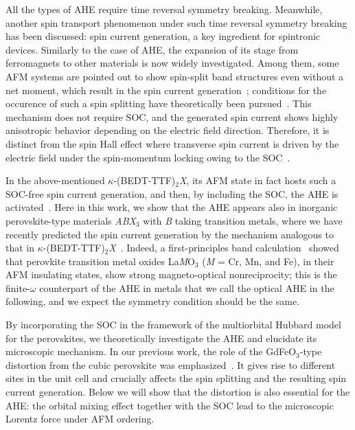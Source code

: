 \documentclass[aps,twocolumn,prb,preprintnumbers,amsmath,amssymb]{revtex4-2}
\begin{document}
All the types of AHE require time reversal symmetry breaking. 
Meanwhile, another spin transport phenomenon under such time reversal symmetry breaking has been discussed: 
 spin current generation, a key ingredient for spintronic devices. 
Similarly to the case of AHE, the expansion of its stage from ferromagnets to other materials is now widely investigated. 
Among them, some AFM systems are pointed out to show spin-split band structures even without a net moment, 
 which result in the spin current generation~\cite{naka2, gonzalez}; 
 conditions for the occurence of such a spin splitting have theoretically been pursued~\cite{hayami, hayami2, yuan, hayami3, yuan2}. 
This mechanism does not require SOC, and the generated spin current shows highly anisotropic behavior depending on the electric field direction. 
Therefore, it is distinct from the spin Hall effect where transverse spin current is driven by the electric field 
 under the spin-momentum locking owing to the SOC~\cite{dyakonov, hirsch, murakami, sinova}. 

In the above-mentioned $\kappa$-(BEDT-TTF)$_2${\it X}, 
 its AFM state in fact hosts such a SOC-free spin current generation, 
 and then, by including the SOC, the AHE is activated~\cite{naka}. 
Here in this work, we show that the AHE appears also in inorganic perovskite-type materials {\it ABX}$_3$ with {\it B} taking transition metals, 
 where we have recently predicted the spin current generation by the mechanism analogous to that in $\kappa$-(BEDT-TTF)$_2${\it X}~\cite{naka3}. 
Indeed, a first-principles band calculation~\cite{solovyev} showed that perovkite transition metal oxides La{\it M}O$_3$ ({\it M} = Cr, Mn, and Fe), in their AFM insulating states,   
 show strong magneto-optical nonreciprocity; 
 this is the finite-$\omega$ counterpart of the AHE in metals that we call the optical AHE in the following, and we expect the symmetry condition should be the same.  

By incorporating the SOC in the framework of the multiorbital Hubbard model for the perovskites, 
 we theoretically investigate the AHE and elucidate its microscopic mechanism. 
In our previous work, the role of the GdFeO$_3$-type distortion from the cubic perovskite was emphasized~\cite{naka3}. 
It gives rise to different sites in the unit cell and crucially affects the spin splitting and the resulting spin current generation. 
Below we will show that the distortion is also essential for the AHE: 
 the orbital mixing effect together with the SOC lead to 
 the microscopic Lorentz force under AFM ordering.  
\end{document}
